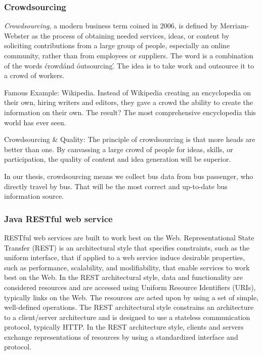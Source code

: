 \subsubsection{Crowdsourcing}
	\textit{Crowdsourcing}, a modern business term coined in 2006, is defined by Merriam-Webster as the process of obtaining needed services, ideas, or content by soliciting contributions from a large group of people, especially an online community, rather than from employees or suppliers. The word is a combination of the words \'crowd\' and \'outsourcing\'. The idea is to take work and outsource it to a crowd of workers.

	Famous Example: Wikipedia. Instead of Wikipedia creating an encyclopedia on their own, hiring writers and editors, they gave a crowd the ability to create the information on their own. The result? The most comprehensive encyclopedia this world has ever seen.

	Crowdsourcing \& Quality: The principle of crowdsourcing is that more heads are better than one. By canvassing a large crowd of people for ideas, skills, or participation, the quality of content and idea generation will be superior.

	In our thesis, crowdsourcing means we collect bus data from bus passenger, who directly travel by bus. That will be the most correct and up-to-date bus information source.
\subsubsection{Java RESTful web service}
	RESTful web services are built to work best on the Web. Representational State Transfer (REST) is an architectural style that specifies constraints, such as the uniform interface, that if applied to a web service induce desirable properties, such as performance, scalability, and modifiability, that enable services to work best on the Web. In the REST architectural style, data and functionality are considered resources and are accessed using Uniform Resource Identifiers (URIs), typically links on the Web. The resources are acted upon by using a set of simple, well-defined operations. The REST architectural style constrains an architecture to a client/server architecture and is designed to use a stateless communication protocol, typically HTTP. In the REST architecture style, clients and servers exchange representations of resources by using a standardized interface and protocol.


